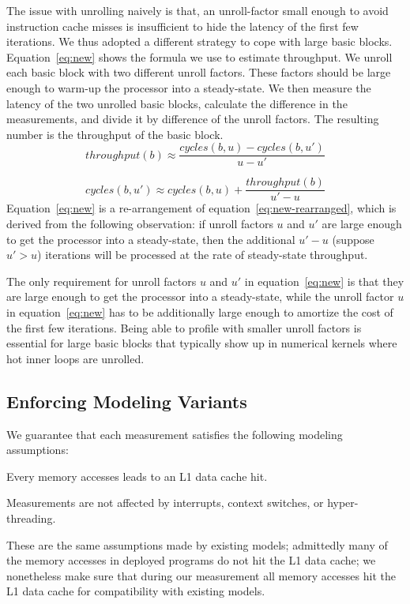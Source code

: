 The issue with unrolling naively is that,
an unroll-factor small enough to 
avoid instruction cache misses is 
insufficient to hide the latency of the first few iterations.
We thus adopted a different strategy to cope with large basic blocks.
Equation~\ref{eq:new} shows the formula we use to estimate throughput.
We unroll each basic block with two different unroll factors.
These factors should be large enough 
to warm-up the processor into a steady-state.
We then measure the latency of the two unrolled basic blocks,
calculate the difference in the measurements, and divide it 
by difference of the unroll factors.
The resulting number is the throughput of the basic block.
\begin{equation}
\mathit{throughput}(b) \approx 
\frac{\mathit{cycles}(b, u) - \mathit{cycles}(b, u')}{u-u'}
\label{eq:new}
\end{equation}

\begin{equation}
\mathit{cycles}(b, u') \approx 
\mathit{cycles}(b, u) + \frac{\mathit{throughput(b)}}{u'-u}
\label{eq:new-rearranged}
\end{equation}
Equation~\ref{eq:new} is a re-arrangement of equation~\ref{eq:new-rearranged},
which is derived from the following observation:
if unroll factors $u$ and $u'$ are large enough
to get the processor into a steady-state,
then the additional $u'-u$ (suppose $u' > u$) iterations will be processed at 
the rate of steady-state throughput.

The only requirement for unroll factors $u$ and $u'$ in equation~\ref{eq:new}
is that they are large enough to get the processor into a steady-state,
while the unroll factor $u$ in equation~\ref{eq:new} has to be additionally
large enough to amortize the cost of the first few iterations.
Being able to profile with smaller unroll factors is essential
for large basic blocks that typically show up in numerical kernels where
hot inner loops are unrolled.

\subsection{Enforcing Modeling Variants}\label{sec:invariants}
We guarantee that each measurement satisfies the following modeling assumptions:
\begin{enumerate*}
    \item Every memory accesses leads to an L1 data cache hit. 
    \item Measurements are not affected by interrupts, context switches,
    or hyper-threading.
\end{enumerate*}
These are the same assumptions made by existing models;
admittedly many of the memory accesses in deployed programs do not hit the L1 data cache;
we nonetheless make sure that during our measurement all memory accesses hit the L1 data cache for compatibility with existing models.

